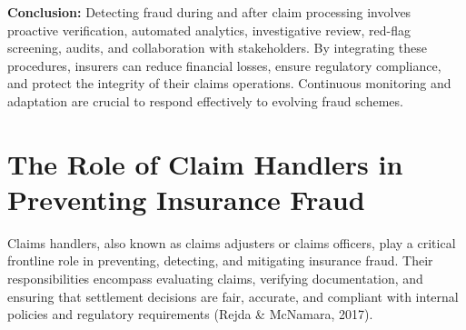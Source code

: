 \documentclass[12pt,a4paper]{article}
\begin{document}
\begin{example}
\textbf{Conclusion:} Detecting fraud during and after claim processing involves proactive verification, automated analytics, investigative review, red-flag screening, audits, and collaboration with stakeholders. By integrating these procedures, insurers can reduce financial losses, ensure regulatory compliance, and protect the integrity of their claims operations. Continuous monitoring and adaptation are crucial to respond effectively to evolving fraud schemes.
\end{example}

\section{The Role of Claim Handlers in Preventing Insurance Fraud}

Claims handlers, also known as claims adjusters or claims officers, play a critical frontline role in preventing, detecting, and mitigating insurance fraud. Their responsibilities encompass evaluating claims, verifying documentation, and ensuring that settlement decisions are fair, accurate, and compliant with internal policies and regulatory requirements (Rejda \& McNamara, 2017).
\end{document}
